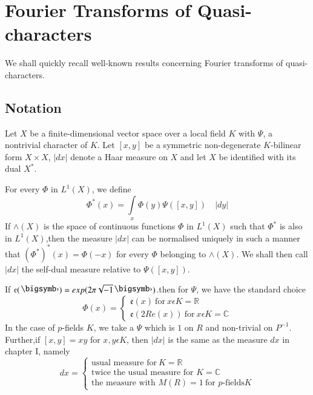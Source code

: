 \section{Fourier Transforms of Quasi-characters}\label{chap2:sec1} %

 We shall quickly recall well-known results concerning Fourier
 transforms of quasi-characters. 

\subsection{Notation}\label{chap2:sec1:subsec1} %

 Let $X$ be a finite-dimensional vector space over a local field $K$
 with $\Psi$, a nontrivial character of $K$. Let $[x, y]$ be a
 symmetric non-degenerate $K$-bilinear form $X \times X$, $|dx|$ denote a
 Haar measure on $X$ and let $X$ be identified with its dual
 $X^{\ast}$. 

 For every $\Phi$ in $L^{1}(X)$, we define
\begin{equation*}
  \Phi^{\ast}(x)=\int\limits_{x}\Phi(y)\Psi([x, y])\quad|dy|
\end{equation*}
If $\wedge(X)$ is the space of continuous functions $\Phi$ in
$L^{1}(X)$ such that $\Phi^{\ast}$ is also in $L^{1}(X)$,then the
measure $|dx|$ can be normalised uniquely in such a manner that
$(\Phi^{\ast})^{\ast}(x)=\Phi(-x)$ for every $\Phi$ belonging to
$\wedge(X)$. We shall then call\pageoriginale $|dx|$ the self-dual measure relative
to $\Psi([x,y])$.

 If $\mathfrak{e}(\bigdot)=exp(2 \pi \sqrt{-1}\bigdot)$.then for
 $\Psi$, we have the standard choice
\begin{equation*}
  \Phi(x)=
  \begin{cases}
    \mathfrak{e}(x) ~\text{for}~ x\epsilon K=\mathbb{R}\\
    \mathfrak{e}(2 Re(x)) ~\text{for}~ x\epsilon K=\mathbb{C}
  \end{cases}
\end{equation*}
In the case of $p$-fields $K$, we take a $\Psi$ which is $1$ on $R$ and
non-trivial on $P^{-1}$. Further,if $[x,y]=xy$ for $x,y\epsilon K$,
then $|dx|$ is the same as the measure $dx$ in chapter I, namely
\begin{equation*}
  dx=
  \begin{cases}
    \text{usual measure for}~ K=\mathbb{R}\\
    \text{twice the usual measure for } K=\mathbb{C}\\
    \text{the measure with } M(R)=1 ~\text{for $p$-fields} K
  \end{cases}
\end{equation*}

